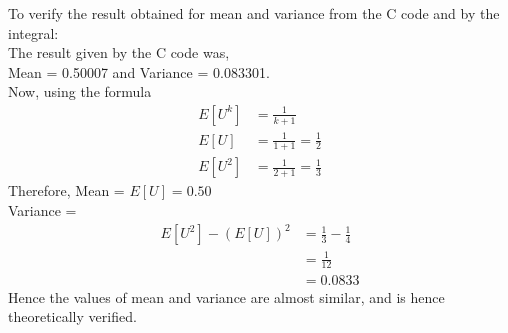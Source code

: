 \documentclass[journal,12pt,twocolumn]{IEEEtran}
\begin{document}
To verify the result obtained for mean and variance from the C code and by the integral:\\
The result given by the C code was,\\Mean = 0.50007 and Variance = 0.083301.\\
Now, using the formula 
\begin{align}
    E[U^{k}] &= \frac{1}{k+1}\\
    E[U] &= \frac{1}{1+1} = \frac{1}{2}\\
    E[U^2] &= \frac{1}{2+1} = \frac{1}{3}
\end{align}
Therefore, Mean = $E[U] = 0.50$\\
Variance = \\
\begin{align}
    E[U^2] - (E[U])^2 &= \frac{1}{3} - \frac{1}{4}\\
    &=\frac{1}{12}\\
    &= 0.0833
\end{align}
Hence the values of mean and variance are almost similar, and is hence theoretically verified.
\end{document}
